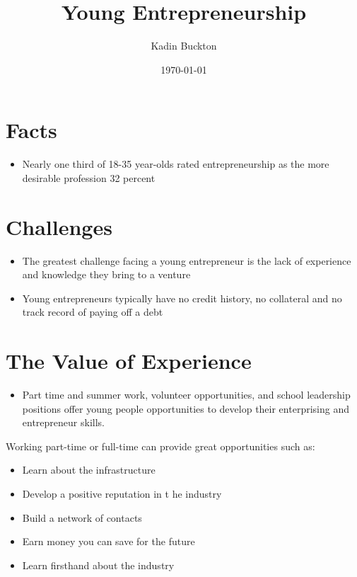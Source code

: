 \documentclass[11pt]{article}
\author{Kadin Buckton}
\date{\today}
\title{Young Entrepreneurship}
\begin{document}
\maketitle
\tableofcontents


\section{Facts}
\label{sec:orga39fcb6}
\begin{itemize}
\item Nearly one third of 18-35 year-olds rated entrepreneurship as the more desirable profession
32 percent
\end{itemize}

\section{Challenges}
\label{sec:org34b0271}
\begin{itemize}
\item The greatest challenge facing a young entrepreneur is the lack of experience and knowledge they bring to a venture
\item Young entrepreneurs typically have no credit history, no collateral and no track record of paying off a debt
\end{itemize}

\section{The Value of Experience}
\label{sec:org841db57}
\begin{itemize}
\item Part time and summer work, volunteer opportunities, and school leadership positions offer young people opportunities to develop their enterprising and entrepreneur skills.
\end{itemize}

Working part-time or full-time can provide great opportunities such as:
\begin{itemize}
\item Learn about the infrastructure
\item Develop a positive reputation in t he industry
\item Build a network of contacts
\item Earn money you can save for the future
\item Learn firsthand about the industry
\end{itemize}
\end{document}
